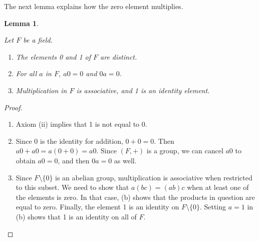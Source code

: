 \documentclass[
]{book}
\newtheorem{lemma}{Lemma}[chapter]
\theoremstyle{definition}
\theoremstyle{definition}
\theoremstyle{definition}
\theoremstyle{definition}
\theoremstyle{remark}
\begin{document}
The next lemma explains how the zero element multiplies.

\begin{lemma}
\protect\hypertarget{lem:unnamed-chunk-80}{}\label{lem:unnamed-chunk-80}

Let \(F\) be a field.

\begin{enumerate}
\def\labelenumi{(\alph{enumi})}
\item
  The elements 0 and 1 of \(F\) are distinct.
\item
  For all \(a\) in \(F\), \(a0 = 0\) and \(0a = 0\).
\item
  Multiplication in \(F\) is associative, and 1 is an identity element.
\end{enumerate}

\end{lemma}

\begin{proof}
\leavevmode

\begin{enumerate}
\def\labelenumi{(\alph{enumi})}
\item
  Axiom (ii) implies that 1 is not equal to 0.
\item
  Since 0 is the identity for addition, \(0 + 0 = 0\). Then \(a0 + a0 = a(0 + 0)= a0\). Since \((F,+)\) is a group, we can cancel \(a0\) to obtain \(a0 = 0\), and then \(0a = 0\) as well.
\item
  Since \(F \setminus \{0\}\) is an abelian group, multiplication is associative when restricted to this subset. We need to show that \(a(bc) = (ab)c\) when at least one of the elements is zero. In that case, (b) shows that the products in question are equal to zero. Finally, the element 1 is an identity on \(F \setminus \{0\}\). Setting \(a = 1\) in (b) shows that 1 is an identity on all of \(F\).
\end{enumerate}

\end{proof}
\end{document}
